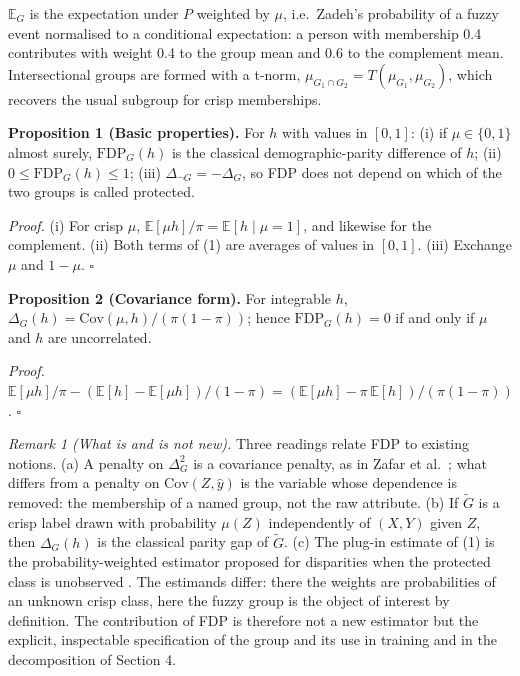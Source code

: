 \(\mathbb{E}_G\) is the expectation under \(P\) weighted by \(\mu\), i.e.~Zadeh's probability of a fuzzy event \cite{zadeh68} normalised to a conditional expectation: a person with membership 0.4 contributes with weight 0.4 to the group mean and 0.6 to the complement mean. Intersectional groups are formed with a t-norm, \(\mu_{G_1 \cap G_2} = T(\mu_{G_1},\mu_{G_2})\), which recovers the usual subgroup for crisp memberships.

\textbf{Proposition 1 (Basic properties).} For \(h\) with values in \([0,1]\): (i) if \(\mu \in \{0,1\}\) almost surely, \(\mathrm{FDP}_{G}(h)\) is the classical demographic-parity difference of \(h\); (ii) \(0 \leq \mathrm{FDP}_{G}(h) \leq 1\); (iii) \(\Delta_{\neg G} = -\Delta_{G}\), so FDP does not depend on which of the two groups is called protected.

\emph{Proof.} (i) For crisp \(\mu\), \(\mathbb{E}[\mu h]/\pi = \mathbb{E}[h \mid \mu = 1]\), and likewise for the complement. (ii) Both terms of (1) are averages of values in \([0,1]\). (iii) Exchange \(\mu\) and \(1 - \mu\). \(\square\)

\textbf{Proposition 2 (Covariance form).} For integrable \(h\), \(\Delta_{G}(h) = \mathrm{Cov}(\mu,h)/(\pi(1 - \pi))\); hence \(\mathrm{FDP}_{G}(h) = 0\) if and only if \(\mu\) and \(h\) are uncorrelated.

\emph{Proof.} \(\mathbb{E}[\mu h]/\pi - (\mathbb{E}[h] - \mathbb{E}[\mu h])/(1 - \pi) = (\mathbb{E}[\mu h] - \pi\,\mathbb{E}[h])/(\pi(1 - \pi))\). \(\square\)

\emph{Remark 1 (What is and is not new).} Three readings relate FDP to existing notions. (a) A penalty on \(\Delta_G^2\) is a covariance penalty, as in Zafar et al.~\cite{zafar}; what differs from a penalty on \(\mathrm{Cov}(Z,\hat y)\) is the variable whose dependence is removed: the membership of a named group, not the raw attribute. (b) If \(\tilde G\) is a crisp label drawn with probability \(\mu(Z)\) independently of \((X,Y)\) given \(Z\), then \(\Delta_G(h)\) is the classical parity gap of \(\tilde G\). (c) The plug-in estimate of (1) is the probability-weighted estimator proposed for disparities when the protected class is unobserved \cite{chen2019,kallus2022}. The estimands differ: there the weights are probabilities of an unknown crisp class, here the fuzzy group is the object of interest by definition. The contribution of FDP is therefore not a new estimator but the explicit, inspectable specification of the group and its use in training and in the decomposition of Section 4.

